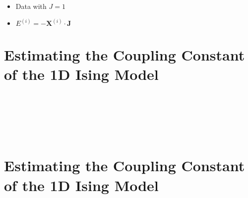 \documentclass[11pt]{article}
\begin{document}
\begin{itemize}
    \item Data with $J=1$
    \item $E^{(i)} = -\boldsymbol{X}^{(i)} \cdot \boldsymbol{J}$
\end{itemize}

\newpage
\hypertarget{estimating-the-coupling-constant-of-the-1d-ising-model}{%
\section*{Estimating the Coupling Constant of the 1D Ising
Model}\label{estimating-the-coupling-constant-of-the-1d-ising-model3}}
    \begin{center}
    \end{center}
    { \hspace*{\fill} \\}
    
    \begin{center}
    \end{center}
    { \hspace*{\fill} \\}
    
    \begin{center}
    \end{center}
    { \hspace*{\fill} \\}
    
\newpage
\hypertarget{estimating-the-coupling-constant-of-the-1d-ising-model}{%
\section*{Estimating the Coupling Constant of the 1D Ising
Model}\label{estimating-the-coupling-constant-of-the-1d-ising-model4}}
    \begin{center}
    \end{center}
    { \hspace*{\fill} \\}
    
    \begin{center}
    \end{center}
    { \hspace*{\fill} \\}
    
\end{document}
